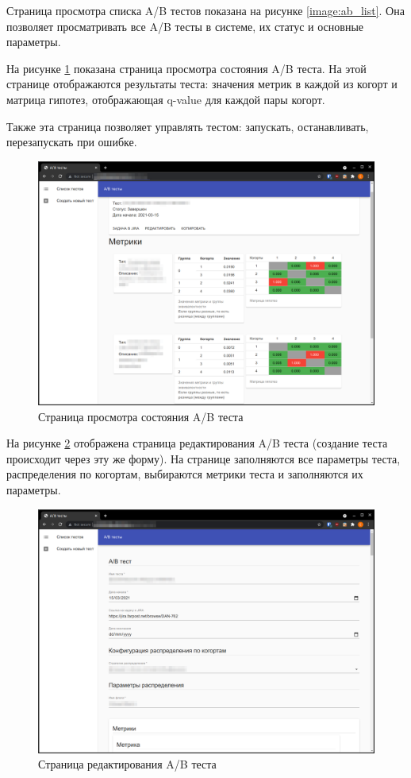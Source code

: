 \documentclass[../document.tex]{subfiles}
\begin{document}
	\par Страница просмотра списка A/B тестов показана на рисунке \ref{image:ab_list}. Она позволяет просматривать все A/B тесты в системе, их статус и основные параметры.
	\par На рисунке \ref{image:ab_page} показана страница просмотра состояния A/B теста. На этой странице отображаются результаты теста: значения метрик в каждой из когорт и  матрица гипотез, отображающая q-value для каждой пары когорт.
	\par Также эта страница позволяет управлять тестом: запускать, останавливать, перезапускать при ошибке.
	\begin{figure}[h]
		\centering
		\includegraphics[width=\linewidth]{test_page.png}
		\caption{\label{image:ab_page}Страница просмотра состояния A/B теста}
	\end{figure}
	\par На рисунке \ref{image:ab_edit} отображена страница редактирования A/B теста (создание теста происходит через эту же форму). На странице заполняются все параметры теста, распределения по когортам, выбираются метрики теста и заполняются их параметры.
	\begin{figure}[h]
		\centering
		\includegraphics[width=\linewidth]{edit_page.png}
		\caption{\label{image:ab_edit}Страница редактирования A/B теста}
	\end{figure}
	\FloatBarrier
\end{document}
